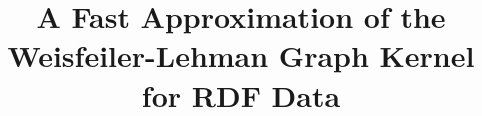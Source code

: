 \documentclass{beamer}
\title{A Fast Approximation of the Weisfeiler-Lehman Graph Kernel for RDF Data}
\begin{document}
	\begin{frame}
		\titlepage
	\end{frame}
\end{document}
